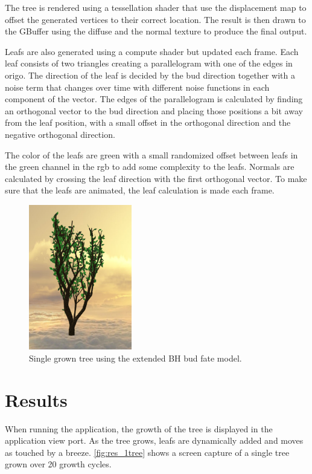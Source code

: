 \documentclass[11pt]{article} %
\begin{document}
The tree is rendered using a tessellation shader that use the displacement map to offset the generated vertices to their correct location.
The result is then drawn to the GBuffer using the diffuse and the normal texture to produce the final output.

Leafs are also generated using a compute shader but updated each frame.
Each leaf consists of two triangles creating a parallelogram with one of the edges in origo.
The direction of the leaf is decided by the bud direction together with a noise term that changes over time with different noise functions in each component of the vector.
The edges of the parallelogram is calculated by finding an orthogonal vector to the bud direction and placing those positions a bit away from the leaf position, with a small offset in the orthogonal direction and the negative orthogonal direction.

The color of the leafs are green with a small randomized offset between leafs in the green channel in the rgb to add some complexity to the leafs.
Normals are calculated by crossing the leaf direction with the first orthogonal vector. To make sure that the leafs are animated, the leaf calculation is made each frame.

\begin{figure}[htp]
	\centering
	\includegraphics[width=0.4\textwidth]{1tree.png}
	\caption{Single grown tree using the extended BH bud fate model.}
	\label{fig:res_1tree}
\end{figure}

\section{Results}
When running the application, the growth of the tree is displayed in the application view port.
As the tree grows, leafs are dynamically added and moves as touched by a breeze.
\autoref{fig:res_1tree} shows a screen capture of a single tree grown over 20 growth cycles.
\end{document}
